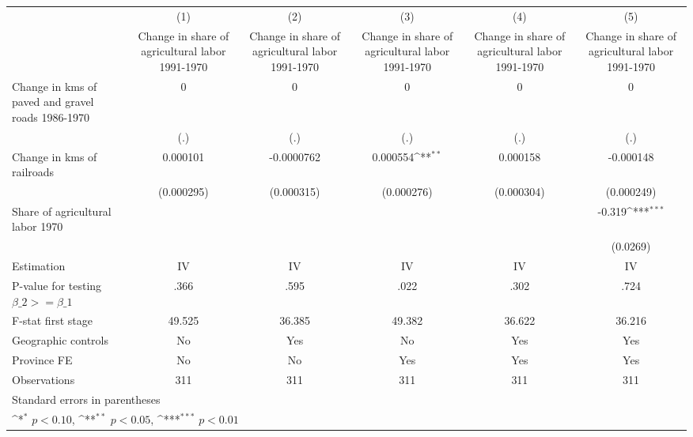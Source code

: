{
\def\sym#1{\ifmmode^{#1}\else\(^{#1}\)\fi}
\begin{tabular}{l*{5}{c}}
\hline\hline
                    &\multicolumn{1}{c}{(1)}&\multicolumn{1}{c}{(2)}&\multicolumn{1}{c}{(3)}&\multicolumn{1}{c}{(4)}&\multicolumn{1}{c}{(5)}\\
                    &\multicolumn{1}{c}{Change in share of agricultural labor 1991-1970}&\multicolumn{1}{c}{Change in share of agricultural labor 1991-1970}&\multicolumn{1}{c}{Change in share of agricultural labor 1991-1970}&\multicolumn{1}{c}{Change in share of agricultural labor 1991-1970}&\multicolumn{1}{c}{Change in share of agricultural labor 1991-1970}\\
\hline
Change in kms of paved and gravel roads 1986-1970&           0         &           0         &           0         &           0         &           0         \\
                    &         (.)         &         (.)         &         (.)         &         (.)         &         (.)         \\
[1em]
Change in kms of railroads&    0.000101         &  -0.0000762         &    0.000554\sym{**} &    0.000158         &   -0.000148         \\
                    &  (0.000295)         &  (0.000315)         &  (0.000276)         &  (0.000304)         &  (0.000249)         \\
[1em]
Share of agricultural labor 1970&                     &                     &                     &                     &      -0.319\sym{***}\\
                    &                     &                     &                     &                     &    (0.0269)         \\
\hline
Estimation          &          IV         &          IV         &          IV         &          IV         &          IV         \\
P-value for testing $\beta\_2 >= \beta\_1$&        .366         &        .595         &        .022         &        .302         &        .724         \\
F-stat first stage  &      49.525         &      36.385         &      49.382         &      36.622         &      36.216         \\
Geographic controls &          No         &         Yes         &          No         &         Yes         &         Yes         \\
Province FE         &          No         &          No         &         Yes         &         Yes         &         Yes         \\
Observations        &         311         &         311         &         311         &         311         &         311         \\
\hline\hline
\multicolumn{6}{l}{\footnotesize Standard errors in parentheses}\\
\multicolumn{6}{l}{\footnotesize \sym{*} \(p<0.10\), \sym{**} \(p<0.05\), \sym{***} \(p<0.01\)}\\
\end{tabular}
}
